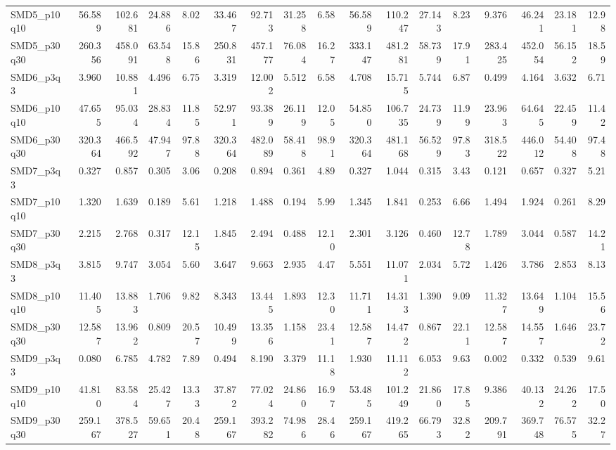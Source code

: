 \begin{longtable}{lrrrrrrrrrrrrrrrr}
SMD5\_p10q10 & 56.589 & 102.681 & 24.886 & 8.02 & 33.467 & 92.713 & 31.258 & 6.58 & 56.589 & 110.247 & 27.143 & 8.23 & 9.376 & 46.241 & 23.181 & 12.98 \\
SMD5\_p30q30 & 260.356 & 458.091 & 63.548 & 15.86 & 250.831 & 457.177 & 76.084 & 16.27 & 333.147 & 481.281 & 58.739 & 17.91 & 283.425 & 452.054 & 56.152 & 18.59 \\
SMD6\_p3q3 & 3.960 & 10.881 & 4.496 & 6.75 & 3.319 & 12.002 & 5.512 & 6.58 & 4.708 & 15.715 & 5.744 & 6.87 & 0.499 & 4.164 & 3.632 & 6.71 \\
SMD6\_p10q10 & 47.655 & 95.034 & 28.834 & 11.85 & 52.971 & 93.389 & 26.119 & 12.05 & 54.850 & 106.735 & 24.739 & 11.99 & 23.963 & 64.645 & 22.459 & 11.42 \\
SMD6\_p30q30 & 320.364 & 466.592 & 47.947 & 97.88 & 320.364 & 482.089 & 58.418 & 98.91 & 320.364 & 481.168 & 56.529 & 97.83 & 318.522 & 446.012 & 54.408 & 97.48 \\
SMD7\_p3q3 & 0.327 & 0.857 & 0.305 & 3.06 & 0.208 & 0.894 & 0.361 & 4.89 & 0.327 & 1.044 & 0.315 & 3.43 & 0.121 & 0.657 & 0.327 & 5.21 \\
SMD7\_p10q10 & 1.320 & 1.639 & 0.189 & 5.61 & 1.218 & 1.488 & 0.194 & 5.99 & 1.345 & 1.841 & 0.253 & 6.66 & 1.494 & 1.924 & 0.261 & 8.29 \\
SMD7\_p30q30 & 2.215 & 2.768 & 0.317 & 12.15 & 1.845 & 2.494 & 0.488 & 12.10 & 2.301 & 3.126 & 0.460 & 12.78 & 1.789 & 3.044 & 0.587 & 14.21 \\
SMD8\_p3q3 & 3.815 & 9.747 & 3.054 & 5.60 & 3.647 & 9.663 & 2.935 & 4.47 & 5.551 & 11.071 & 2.034 & 5.72 & 1.426 & 3.786 & 2.853 & 8.13 \\
SMD8\_p10q10 & 11.405 & 13.883 & 1.706 & 9.82 & 8.343 & 13.445 & 1.893 & 12.30 & 11.711 & 14.313 & 1.390 & 9.09 & 11.327 & 13.649 & 1.104 & 15.56 \\
SMD8\_p30q30 & 12.587 & 13.962 & 0.809 & 20.57 & 10.499 & 13.356 & 1.158 & 23.41 & 12.587 & 14.472 & 0.867 & 22.11 & 12.587 & 14.557 & 1.646 & 23.72 \\
SMD9\_p3q3 & 0.080 & 6.785 & 4.782 & 7.89 & 0.494 & 8.190 & 3.379 & 11.18 & 1.930 & 11.112 & 6.053 & 9.63 & 0.002 & 0.332 & 0.539 & 9.61 \\
SMD9\_p10q10 & 41.810 & 83.584 & 25.427 & 13.33 & 37.872 & 77.024 & 24.860 & 16.97 & 53.485 & 101.249 & 21.860 & 17.85 & 9.386 & 40.132 & 24.262 & 17.50 \\
SMD9\_p30q30 & 259.167 & 378.527 & 59.651 & 20.48 & 259.167 & 393.282 & 74.986 & 28.46 & 259.167 & 419.265 & 66.793 & 32.82 & 209.791 & 369.748 & 76.575 & 32.27 \\

\end{longtable}
